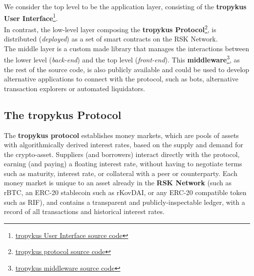 \documentclass{article}
\begin{document}
We consider the top level to be the application layer, consisting of the \textbf{tropykus User Interface}\footnote{\href{https://github.com/TruStartUp/tropykus-app}{tropykus User Interface source code}}.
\\
In contrast, the low-level layer composing the \textbf{tropykus Protocol}\footnote{\href{https://github.com/TruStartUp/tropykus-protocol}{tropykus protocol source code}}, is distributed (\textit{deployed}) as a set of smart contracts on the RSK Network.
\\
The middle layer is a custom made library that manages the interactions between the lower level (\textit{back-end}) and the top level (\textit{front-end}). This \textbf{middleware}\footnote{\href{https://github.com/TruStartUp/tropykus-app/src/components/middleware}{tropykus middleware source code}}, as the rest of the source code, is also publicly available and could be used to develop alternative applications to connect with the protocol, such as bots, alternative transaction explorers or automated liquidators.

\subsection{The tropykus Protocol}

The \textbf{tropykus protocol} establishes money markets, which are pools of assets with algorithmically derived interest rates, based on the supply and demand for the
crypto-asset. Suppliers (and borrowers) interact directly with the protocol, earning (and paying) a floating interest rate, without having to negotiate terms such as maturity, interest rate, or collateral with a peer or counterparty.
Each money market is unique to an asset already in the \textbf{RSK Network} (such as rBTC, an ERC-20 stablecoin such as rKovDAI, or any ERC-20 compatible token such as RIF), and contains a transparent and publicly-inspectable ledger, with a record of all transactions and historical interest rates.

\end{document}
